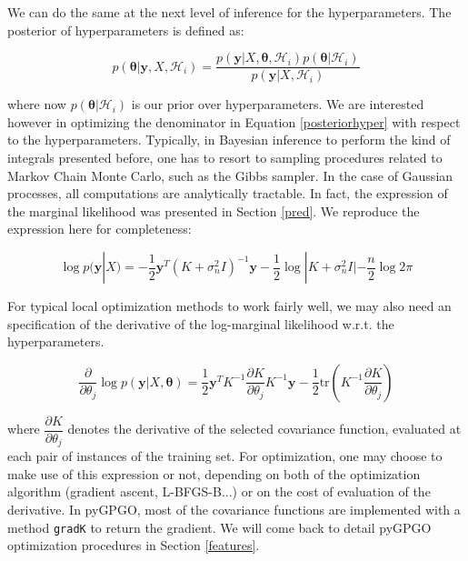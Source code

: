 \documentclass[10pt,a4paper,twoside]{book}
\begin{document}
We can do the same at the next level of inference for the hyperparameters. The posterior of hyperparameters is defined as:

\begin{equation}
\label{posteriorhyper}
p(\boldsymbol{\theta}|\boldsymbol{y}, X, \mathcal{H}_i) = \dfrac{p(\boldsymbol{y}|X, \boldsymbol{\theta}, \mathcal{H}_i)p(\boldsymbol{\theta}|\mathcal{H}_i)}{p(\boldsymbol{y}|X, \mathcal{H}_i)}
\end{equation}

where now $p(\boldsymbol{\theta}|\mathcal{H}_i)$ is our prior over hyperparameters. We are interested however in optimizing the denominator in Equation \ref{posteriorhyper} with respect to the hyperparameters. Typically, in Bayesian inference to perform the kind of integrals presented before, one has to resort to sampling procedures related to Markov Chain Monte Carlo, such as the Gibbs sampler. In the case of Gaussian processes, all computations are analytically tractable. In fact, the expression of the marginal likelihood was presented in Section \ref{pred}. We reproduce the expression here for completeness:

\begin{equation}
\log p(\boldsymbol{y}|X) = - \dfrac{1}{2}\boldsymbol{y}^T(K + \sigma^2_n I)^{-1}\boldsymbol{y} - \dfrac{1}{2}\log |K + \sigma^2_n I| - \dfrac{n}{2}\log 2\pi
\end{equation}

For typical local optimization methods to work fairly well, we may also need an specification of the derivative of the log-marginal likelihood w.r.t. the hyperparameters.

\begin{equation}
\dfrac{\partial}{\partial \theta_j}\log p(\boldsymbol{y}|X, \boldsymbol{\theta}) = \dfrac{1}{2}\boldsymbol{y}^T K^{-1}\dfrac{\partial K}{\partial \theta_j}K^{-1}\boldsymbol{y} - \dfrac{1}{2}\textrm{tr}\left(K^{-1} \dfrac{\partial K}{\partial \theta_j} \right)
\end{equation}

where $\dfrac{\partial K}{\partial \theta_j}$ denotes the derivative of the selected covariance function, evaluated at each pair of instances of the training set. For optimization, one may choose to make use of this expression or not, depending on both of the optimization algorithm (gradient ascent, L-BFGS-B...) or on the cost of evaluation of the derivative. In pyGPGO, most of the covariance functions are implemented with a method \texttt{gradK} to return the gradient. We will come back to detail pyGPGO optimization procedures in Section \ref{features}. 
\end{document}
